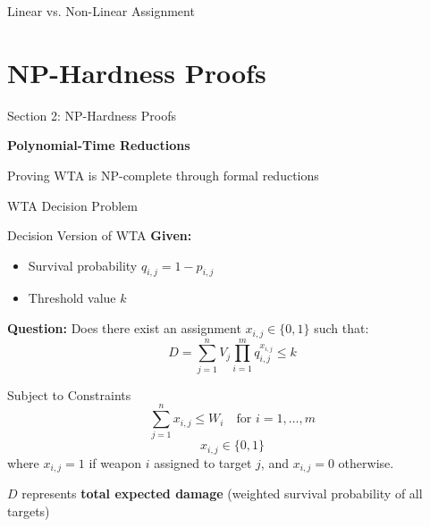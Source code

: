 \documentclass[aspectratio=43,8pt]{beamer}
\begin{document}
\begin{frame}{Linear vs. Non-Linear Assignment}
\begin{center}
\end{center}
\end{frame}

\section{NP-Hardness Proofs}

\begin{frame}{Section 2: NP-Hardness Proofs}
\begin{center}
{\Large\textcolor{primaryblue}{\textbf{Polynomial-Time Reductions}}}

\vspace{0.5cm}
{\normalsize Proving WTA is NP-complete through formal reductions}
\end{center}
\end{frame}

\begin{frame}{WTA Decision Problem}
\begin{block}{Decision Version of WTA}
\textbf{Given:}
\begin{itemize}
    \item Survival probability $q_{i,j} = 1 - p_{i,j}$
    \item Threshold value $k$
\end{itemize}

\textbf{Question:} Does there exist an assignment $x_{i,j} \in \{0,1\}$ such that:
\begin{equation*}
D = \sum_{j=1}^n V_j \prod_{i=1}^m q_{i,j}^{x_{i,j}} \leq k
\end{equation*}
\end{block}

\begin{alertblock}{Subject to Constraints}
$$\sum_{j=1}^n x_{i,j} \leq W_i \quad \text{for } i = 1, \ldots, m$$
$$x_{i,j} \in \{0, 1\}$$
where $x_{i,j} = 1$ if weapon $i$ assigned to target $j$, and $x_{i,j} = 0$ otherwise.

$D$ represents \textbf{total expected damage} (weighted survival probability of all targets)
\end{alertblock}
\end{frame}
\end{document}
